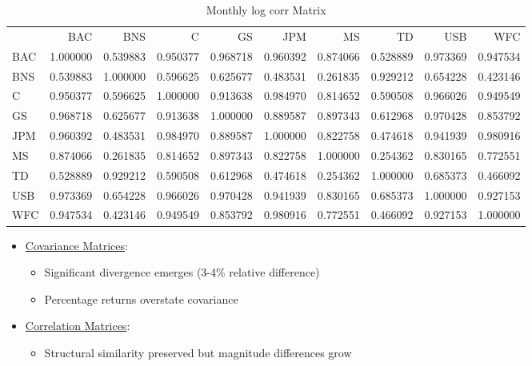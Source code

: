 \documentclass{article}
\begin{document}
\begin{table}
\caption{Monthly log corr Matrix}
\label{tab:monthly_log_corr}
\begin{tabular}{lrrrrrrrrr}
 & BAC & BNS & C & GS & JPM & MS & TD & USB & WFC \\
BAC & 1.000000 & 0.539883 & 0.950377 & 0.968718 & 0.960392 & 0.874066 & 0.528889 & 0.973369 & 0.947534 \\
BNS & 0.539883 & 1.000000 & 0.596625 & 0.625677 & 0.483531 & 0.261835 & 0.929212 & 0.654228 & 0.423146 \\
C & 0.950377 & 0.596625 & 1.000000 & 0.913638 & 0.984970 & 0.814652 & 0.590508 & 0.966026 & 0.949549 \\
GS & 0.968718 & 0.625677 & 0.913638 & 1.000000 & 0.889587 & 0.897343 & 0.612968 & 0.970428 & 0.853792 \\
JPM & 0.960392 & 0.483531 & 0.984970 & 0.889587 & 1.000000 & 0.822758 & 0.474618 & 0.941939 & 0.980916 \\
MS & 0.874066 & 0.261835 & 0.814652 & 0.897343 & 0.822758 & 1.000000 & 0.254362 & 0.830165 & 0.772551 \\
TD & 0.528889 & 0.929212 & 0.590508 & 0.612968 & 0.474618 & 0.254362 & 1.000000 & 0.685373 & 0.466092 \\
USB & 0.973369 & 0.654228 & 0.966026 & 0.970428 & 0.941939 & 0.830165 & 0.685373 & 1.000000 & 0.927153 \\
WFC & 0.947534 & 0.423146 & 0.949549 & 0.853792 & 0.980916 & 0.772551 & 0.466092 & 0.927153 & 1.000000 \\
\end{tabular}
\end{table}

\begin{itemize}
    \item \underline{Covariance Matrices}:
    \begin{itemize}
        \item Significant divergence emerges (3-4\% relative difference)
        \item Percentage returns overstate covariance
    \end{itemize}
    \item \underline{Correlation Matrices}:
    \begin{itemize}
        \item Structural similarity preserved but magnitude differences grow
    \end{itemize}
\end{itemize}
\end{document}
